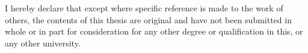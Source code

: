 \begin{declaration}


I hereby declare that except where specific reference is made to the work of others, the contents of this thesis are original and have not been submitted in whole or in part for consideration for any other degree or qualification in this, or any other university.


\end{declaration}